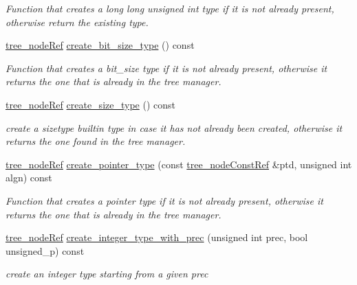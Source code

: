 \begin{DoxyCompactItemize}
\begin{DoxyCompactList}\small\item\em Function that creates a long long unsigned int type if it is not already present, otherwise return the existing type. \end{DoxyCompactList}\item 
\hyperlink{tree__node_8hpp_a6ee377554d1c4871ad66a337eaa67fd5}{tree\+\_\+node\+Ref} \hyperlink{classtree__manipulation_a33b3d06e9207b3d28daf9807a6549d2f}{create\+\_\+bit\+\_\+size\+\_\+type} () const
\begin{DoxyCompactList}\small\item\em Function that creates a bit\+\_\+size type if it is not already present, otherwise it returns the one that is already in the tree manager. \end{DoxyCompactList}\item 
\hyperlink{tree__node_8hpp_a6ee377554d1c4871ad66a337eaa67fd5}{tree\+\_\+node\+Ref} \hyperlink{classtree__manipulation_a5db8217303c41bbc32245048823ad804}{create\+\_\+size\+\_\+type} () const
\begin{DoxyCompactList}\small\item\em create a sizetype builtin type in case it has not already been created, otherwise it returns the one found in the tree manager. \end{DoxyCompactList}\item 
\hyperlink{tree__node_8hpp_a6ee377554d1c4871ad66a337eaa67fd5}{tree\+\_\+node\+Ref} \hyperlink{classtree__manipulation_a6d88570241f098107bc756f50011e3b4}{create\+\_\+pointer\+\_\+type} (const \hyperlink{tree__node_8hpp_a3cf5d02292c940f3892425a5b5fdec3c}{tree\+\_\+node\+Const\+Ref} \&ptd, unsigned int algn) const
\begin{DoxyCompactList}\small\item\em Function that creates a pointer type if it is not already present, otherwise it returns the one that is already in the tree manager. \end{DoxyCompactList}\item 
\hyperlink{tree__node_8hpp_a6ee377554d1c4871ad66a337eaa67fd5}{tree\+\_\+node\+Ref} \hyperlink{classtree__manipulation_a6ad2c7fadb2f6cdba0adc41e61863dbf}{create\+\_\+integer\+\_\+type\+\_\+with\+\_\+prec} (unsigned int prec, bool unsigned\+\_\+p) const
\begin{DoxyCompactList}\small\item\em create an integer type starting from a given prec \end{DoxyCompactList}\item 

\end{DoxyCompactItemize}
